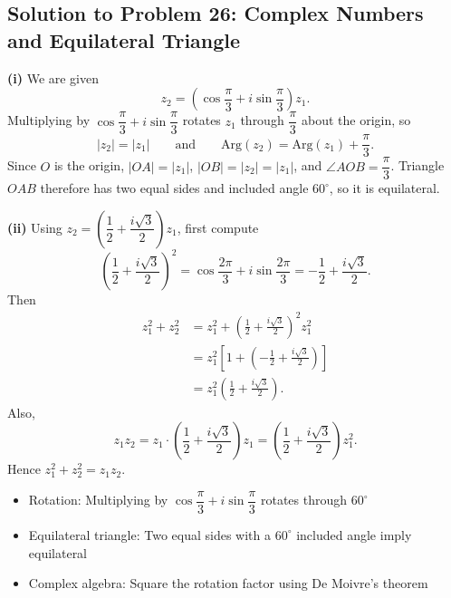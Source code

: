 \subsection{Solution to Problem 26: Complex Numbers and Equilateral Triangle}

\begin{solution}
\textbf{(i)} We are given
\[
z_2 = \left(\cos\frac{\pi}{3} + i\sin\frac{\pi}{3}\right)z_1.
\]
Multiplying by $\cos\dfrac{\pi}{3} + i\sin\dfrac{\pi}{3}$ rotates $z_1$ through $\dfrac{\pi}{3}$ about the origin, so
\[
|z_2| = |z_1| \qquad \text{and} \qquad \text{Arg}(z_2) = \text{Arg}(z_1) + \frac{\pi}{3}.
\]
Since $O$ is the origin, $|OA| = |z_1|$, $|OB| = |z_2| = |z_1|$, and $\angle AOB = \dfrac{\pi}{3}$.
Triangle $OAB$ therefore has two equal sides and included angle $60^\circ$, so it is equilateral.

\textbf{(ii)} Using $z_2 = \left(\dfrac{1}{2} + \dfrac{i\sqrt{3}}{2}\right)z_1$, first compute
\[
\left(\frac{1}{2} + \frac{i\sqrt{3}}{2}\right)^2
= \cos\frac{2\pi}{3} + i\sin\frac{2\pi}{3}
= -\frac{1}{2} + \frac{i\sqrt{3}}{2}.
\]
Then
\begin{align*}
z_1^2 + z_2^2
&= z_1^2 + \left(\frac{1}{2} + \frac{i\sqrt{3}}{2}\right)^2 z_1^2 \\
&= z_1^2\left[1 + \left(-\frac{1}{2} + \frac{i\sqrt{3}}{2}\right)\right] \\
&= z_1^2\left(\frac{1}{2} + \frac{i\sqrt{3}}{2}\right).
\end{align*}
Also,
\[
z_1 z_2 = z_1 \cdot \left(\frac{1}{2} + \frac{i\sqrt{3}}{2}\right) z_1
= \left(\frac{1}{2} + \frac{i\sqrt{3}}{2}\right) z_1^2.
\]
Hence $z_1^2 + z_2^2 = z_1 z_2$.
\end{solution}

\begin{takeaways}
\begin{itemize}
    \item Rotation: Multiplying by $\cos\dfrac{\pi}{3} + i\sin\dfrac{\pi}{3}$ rotates through $60^\circ$
    \item Equilateral triangle: Two equal sides with a $60^\circ$ included angle imply equilateral
    \item Complex algebra: Square the rotation factor using De Moivre's theorem
\end{itemize}
\end{takeaways}
